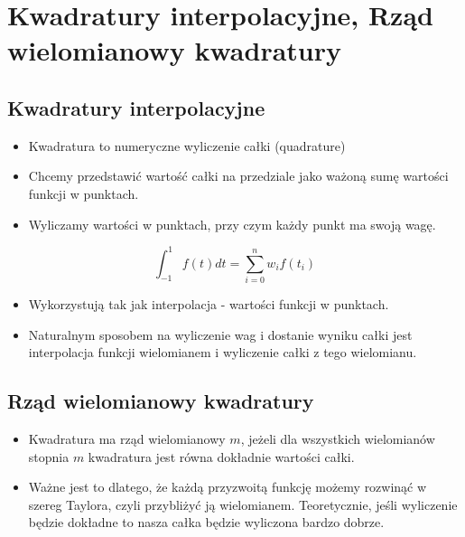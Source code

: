 \documentclass[a4paper]{article}
\begin{document}
\section{Kwadratury interpolacyjne, Rząd wielomianowy kwadratury}

\subsection{Kwadratury interpolacyjne}
\begin{itemize}
    \item Kwadratura to numeryczne wyliczenie całki (quadrature)
    \item Chcemy przedstawić wartość całki na przedziale jako ważoną sumę wartości funkcji w punktach.
    \item Wyliczamy wartości w punktach, przy czym każdy punkt ma swoją wagę.
\end{itemize}

\begin{equation*}
    \int_{-1}^{1} f(t) dt = \sum_{i=0}^{n} w_i f(t_i)
\end{equation*}

\begin{itemize}
    \item Wykorzystują tak jak interpolacja - wartości funkcji w punktach.
    \item Naturalnym sposobem na wyliczenie wag i dostanie wyniku całki jest interpolacja funkcji wielomianem i wyliczenie całki z tego wielomianu.
\end{itemize}

\subsection{Rząd wielomianowy kwadratury}
\begin{itemize}
    \item Kwadratura ma rząd wielomianowy $m$, jeżeli dla wszystkich wielomianów stopnia $m$ kwadratura jest równa dokładnie wartości całki.
    \item Ważne jest to dlatego, że każdą przyzwoitą funkcję możemy rozwinąć w szereg Taylora, czyli przybliżyć ją wielomianem. Teoretycznie, jeśli wyliczenie będzie dokładne to nasza całka będzie wyliczona bardzo dobrze.
\end{itemize}
\end{document}
